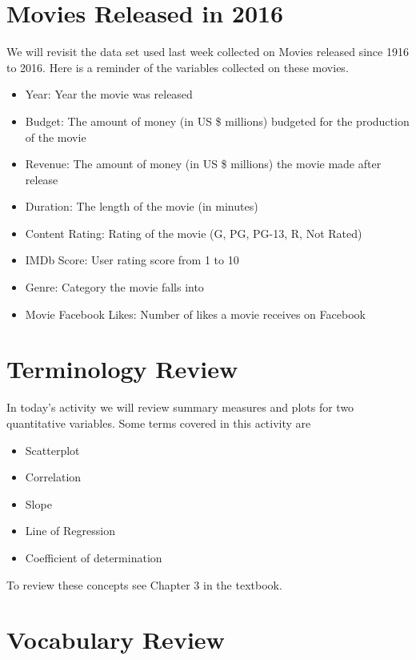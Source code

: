 \documentclass[
]{report}
\begin{document}
\hypertarget{movies-released-in-2016-1}{%
\section{Movies Released in 2016}\label{movies-released-in-2016-1}}

We will revisit the data set used last week collected on Movies released since 1916 to 2016. Here is a reminder of the variables collected on these movies.

\begin{itemize}
\item
  Year: Year the movie was released
\item
  Budget: The amount of money (in US \$ millions) budgeted for the production of the movie
\item
  Revenue: The amount of money (in US \$ millions) the movie made after release
\item
  Duration: The length of the movie (in minutes)
\item
  Content Rating: Rating of the movie (G, PG, PG-13, R, Not Rated)
\item
  IMDb Score: User rating score from 1 to 10
\item
  Genre: Category the movie falls into
\item
  Movie Facebook Likes: Number of likes a movie receives on Facebook
\end{itemize}

\hypertarget{terminology-review-3}{%
\section{Terminology Review}\label{terminology-review-3}}

In today's activity we will review summary measures and plots for two quantitative variables. Some terms covered in this activity are

\begin{itemize}
\item
  Scatterplot
\item
  Correlation
\item
  Slope
\item
  Line of Regression
\item
  Coefficient of determination
\end{itemize}

To review these concepts see Chapter 3 in the textbook.

\hypertarget{vocabulary-review-2}{%
\section{Vocabulary Review}\label{vocabulary-review-2}}
\end{document}
